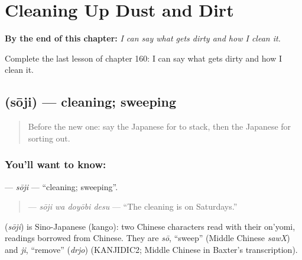 
\chapter{Cleaning Up Dust and Dirt}
\label{ch:ja-cleaning-up-dust-and-dirt}

\begin{chapteropening}
\textbf{By the end of this chapter:} \emph{I can say what gets dirty and how I clean it.}

Complete the last lesson of chapter 160: I can say what gets dirty and how I clean it.
\end{chapteropening}

\section[\texorpdfstring{\ja{そうじ} (sōji)}{そうじ (sōji)}]{ (sōji) — cleaning; sweeping}

\label{lesson:JA-C160-souji}



\begin{quote}
Before the new one: say the Japanese for to stack, then the Japanese for sorting out.
\end{quote}

\subsection*{You'll want to know: }
\textbf{} — \emph{sōji} — \textquotedblleft{}cleaning; sweeping\textquotedblright{}.

\begin{quote}
\textbf{ } — \emph{sōji wa doyōbi desu} — \textquotedblleft{}The cleaning is on Saturdays.\textquotedblright{}
\end{quote}

\begin{cousinweb}
\textbf{} (\emph{sōji}) is Sino-Japanese (kango): two Chinese characters read with their on'yomi, readings borrowed from Chinese. They are \emph{sō}, \textquotedblleft{}sweep\textquotedblright{} (Middle Chinese \emph{sawX}) and \emph{ji}, \textquotedblleft{}remove\textquotedblright{} (\emph{drjo}) (KANJIDIC2; Middle Chinese in Baxter's transcription).
\end{cousinweb}

